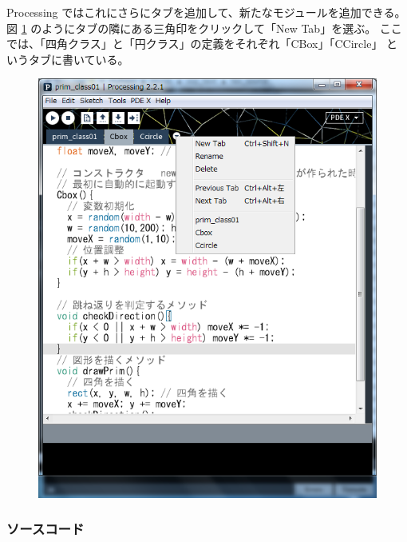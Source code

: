 \documentclass[uplatex,a4j,11pt]{jsarticle}
\begin{document}
Processing ではこれにさらにタブを追加して、新たなモジュールを追加できる。
図 \ref{zu4} のようにタブの隣にある三角印をクリックして「New Tab」を選ぶ。
ここでは、「四角クラス」と「円クラス」の定義をそれぞれ「CBox」「CCircle」
というタブに書いている。

\begin{figure}[htbp]
  \begin{center}
   \includegraphics[width=.3\paperwidth]{zu4.png}
   \caption{}
   \label{zu4}
  \end{center}
\end{figure}

\subsubsection{ソースコード}
\end{document}
